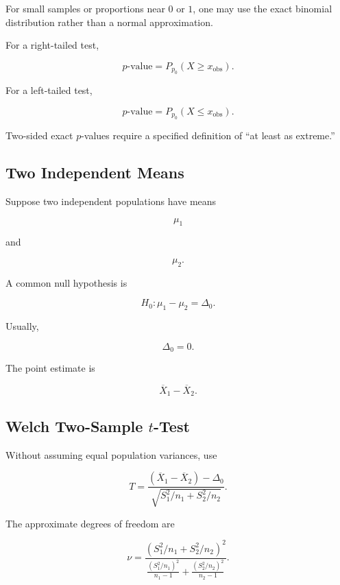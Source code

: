 For small samples or proportions near \(0\) or \(1\), one may use the
exact binomial distribution rather than a normal approximation.

For a right-tailed test,

\[
\boxed{
p\text{-value}
=
P_{p_0}(X\geq x_{\text{obs}}).
}
\]

For a left-tailed test,

\[
\boxed{
p\text{-value}
=
P_{p_0}(X\leq x_{\text{obs}}).
}
\]

Two-sided exact \(p\)-values require a specified definition of
``at least as extreme.''

\subsection{Two Independent Means}
\label{subsec:test-two-independent-means}

Suppose two independent populations have means

\[
\mu_1
\]

and

\[
\mu_2.
\]

A common null hypothesis is

\[
\boxed{
H_0:
\mu_1-\mu_2
=
\Delta_0.
}
\]

Usually,

\[
\Delta_0=0.
\]

The point estimate is

\[
\overline{X}_1-\overline{X}_2.
\]

\subsection{Welch Two-Sample \(t\)-Test}
\label{subsec:welch-two-sample-test}

Without assuming equal population variances, use

\[
\boxed{
T
=
\frac{
(\overline{X}_1-\overline{X}_2)-\Delta_0
}{
\sqrt{
S_1^2/n_1
+
S_2^2/n_2
}
}.
}
\]

The approximate degrees of freedom are

\[
\boxed{
\nu
=
\frac{
\left(
S_1^2/n_1
+
S_2^2/n_2
\right)^2
}{
\frac{
(S_1^2/n_1)^2
}{
n_1-1
}
+
\frac{
(S_2^2/n_2)^2
}{
n_2-1
}
}.
}
\]

